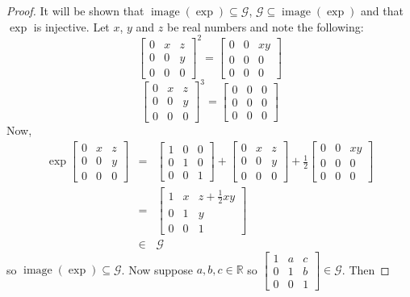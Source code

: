 \documentclass[honours]{UNSWthesis}
\newcommand{\R}{\mathbb{R}}
\newcommand{\G}{\mathcal{G}}
\newcommand{\1}{\mathbf{e}_{1}}
\newcommand{\2}{\mathbf{e}_{3}}
\newcommand{\3}{\mathbf{e}_{3}}
\DeclareMathOperator{\image}{image}
\begin{document}
\begin{proof}
It will be shown that $\image(\exp) \subseteq \G$, $\G \subseteq \image(\exp)$ and that $\exp$ is injective. 
Let $x$, $y$ and $z$ be real numbers and note the following: 
\[
\begin{bmatrix} 0 & x & z \\ 0 & 0 & y \\ 0 & 0 & 0 \end{bmatrix}^2=\begin{bmatrix} 0 & 0 & xy \\ 0 & 0 & 0 \\ 0 & 0 & 0 \end{bmatrix}
\]
\[
\begin{bmatrix} 0 & x & z \\ 0 & 0 & y \\ 0 & 0 & 0 \end{bmatrix}^3=\begin{bmatrix} 0 & 0 & 0 \\ 0 & 0 & 0 \\ 0 & 0 & 0 \end{bmatrix}
\]
Now,
\begin{eqnarray*}
 \exp \begin{bmatrix} 0 & x & z \\ 0 & 0 & y \\ 0 & 0 & 0 \end{bmatrix} &=& \begin{bmatrix} 1 & 0 & 0 \\ 0 & 1 & 0 \\ 0 & 0 & 1 \end{bmatrix} + \begin{bmatrix} 0 & x & z \\ 0 & 0 & y \\ 0 & 0 & 0 \end{bmatrix}+ \frac{1}{2}\begin{bmatrix} 0 & 0 & xy \\ 0 & 0 & 0 \\ 0 & 0 & 0 \end{bmatrix} \\
&=& \begin{bmatrix} 1 & x & z+\frac{1}{2}xy \\ 0 & 1 & y \\ 0 & 0 & 1 \end{bmatrix} \\
&\in & \G
\end{eqnarray*} so $ \image(\exp) \subseteq \G$.
Now suppose $a,b,c \in \R$ so $\begin{bmatrix} 1 & a & c \\ 0 & 1 & b \\ 0 & 0 & 1 \end{bmatrix} \in \G$. Then 

\end{proof}
\end{document}
